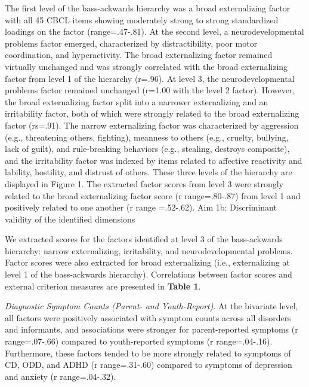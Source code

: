 \documentclass[
  20pt,
  number,
  preprint,
  3p,
  twocolumn]{elsarticle}
\begin{document}
The first level of the bass-ackwards hierarchy was a broad externalizing
factor with all 45 CBCL items showing moderately strong to strong
standardized loadings on the factor (range=.47-.81). At the second
level, a neurodevelopmental problems factor emerged, characterized by
distractibility, poor motor coordination, and hyperactivity. The broad
externalizing factor remained virtually unchanged and was strongly
correlated with the broad externalizing factor from level 1 of the
hierarchy (r=.96). At level 3, the neurodevelopmental problems factor
remained unchanged (r=1.00 with the level 2 factor). However, the broad
externalizing factor split into a narrower externalizing and an
irritability factor, both of which were strongly related to the broad
externalizing factor (rs=.91). The narrow externalizing factor was
characterized by aggression (e.g., threatening others, fighting),
meanness to others (e.g., cruelty, bullying, lack of guilt), and
rule-breaking behaviors (e.g., stealing, destroys composite), and the
irritability factor was indexed by items related to affective reactivity
and lability, hostility, and distrust of others. These three levels of
the hierarchy are displayed in Figure 1. The extracted factor scores
from level 3 were strongly related to the broad externalizing factor
score (r range=.80-.87) from level 1 and positively related to one
another (r range =.52-.62). Aim 1b: Discriminant validity of the
identified dimensions

We extracted scores for the factors identified at level 3 of the
bass-ackwards hierarchy: narrow externalizing, irritability, and
neurodevelopmental problems. Factor scores were also extracted for broad
externalizing (i.e., externalizing at level 1 of the bass-ackwards
hierarchy). Correlations between factor scores and external criterion
measures are presented in \textbf{Table 1}.

\emph{Diagnostic Symptom Counts (Parent- and Youth-Report)}. At the
bivariate level, all factors were positively associated with symptom
counts across all disorders and informants, and associations were
stronger for parent-reported symptoms (r range=.07-.66) compared to
youth-reported symptoms (r range=.04-.16). Furthermore, these factors
tended to be more strongly related to symptoms of CD, ODD, and ADHD (r
range=.31-.60) compared to symptoms of depression and anxiety (r
range=.04-.32).
\end{document}
